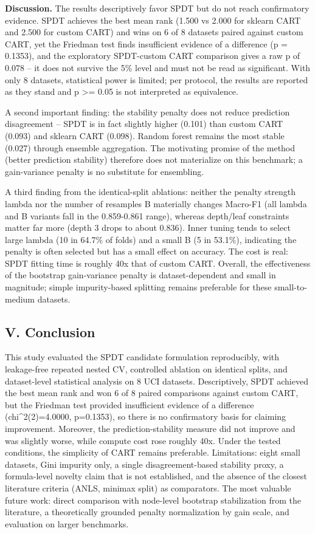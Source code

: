 \documentclass[
  conference]{IEEEtran}
\begin{document}
\textbf{Discussion.} The results descriptively favor SPDT but do not
reach confirmatory evidence. SPDT achieves the best mean rank (1.500 vs
2.000 for sklearn CART and 2.500 for custom CART) and wins on 6 of 8
datasets paired against custom CART, yet the Friedman test finds
insufficient evidence of a difference (p = 0.1353), and the exploratory
SPDT-custom CART comparison gives a raw p of 0.078 -- it does not
survive the 5\% level and must not be read as significant. With only 8
datasets, statistical power is limited; per protocol, the results are
reported as they stand and p \textgreater= 0.05 is not interpreted as
equivalence.

A second important finding: the stability penalty does not reduce
prediction disagreement -- SPDT is in fact slightly higher (0.101) than
custom CART (0.093) and sklearn CART (0.098). Random forest remains the
most stable (0.027) through ensemble aggregation. The motivating promise
of the method (better prediction stability) therefore does not
materialize on this benchmark; a gain-variance penalty is no substitute
for ensembling.

A third finding from the identical-split ablations: neither the penalty
strength lambda nor the number of resamples B materially changes
Macro-F1 (all lambda and B variants fall in the 0.859-0.861 range),
whereas depth/leaf constraints matter far more (depth 3 drops to about
0.836). Inner tuning tends to select large lambda (10 in 64.7\% of
folds) and a small B (5 in 53.1\%), indicating the penalty is often
selected but has a small effect on accuracy. The cost is real: SPDT
fitting time is roughly 40x that of custom CART. Overall, the
effectiveness of the bootstrap gain-variance penalty is
dataset-dependent and small in magnitude; simple impurity-based
splitting remains preferable for these small-to-medium datasets.

\subsection{V. Conclusion}\label{v.-conclusion}

This study evaluated the SPDT candidate formulation reproducibly, with
leakage-free repeated nested CV, controlled ablation on identical
splits, and dataset-level statistical analysis on 8 UCI datasets.
Descriptively, SPDT achieved the best mean rank and won 6 of 8 paired
comparisons against custom CART, but the Friedman test provided
insufficient evidence of a difference (chi\^{}2(2)=4.0000, p=0.1353), so
there is no confirmatory basis for claiming improvement. Moreover, the
prediction-stability measure did not improve and was slightly worse,
while compute cost rose roughly 40x. Under the tested conditions, the
simplicity of CART remains preferable. Limitations: eight small
datasets, Gini impurity only, a single disagreement-based stability
proxy, a formula-level novelty claim that is not established, and the
absence of the closest literature criteria (ANLS, minimax split) as
comparators. The most valuable future work: direct comparison with
node-level bootstrap stabilization from the literature, a theoretically
grounded penalty normalization by gain scale, and evaluation on larger
benchmarks.
\end{document}
